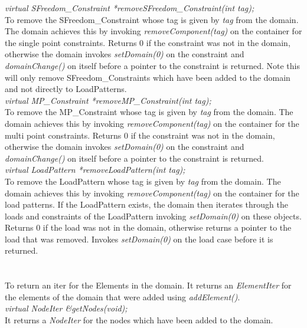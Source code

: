 {\em virtual SFreedom\_Constraint *removeSFreedom\_Constraint(int tag);}\\
To remove the SFreedom\_Constraint whose tag is given by {\em tag} from the
domain. The domain achieves this by invoking {\em
removeComponent(tag)} on the container for the single point
constraints. Returns $0$ if the constraint was not in the domain,
otherwise the domain invokes {\em setDomain(0)} on the constraint and
{\em domainChange()} on itself before a pointer to the constraint is
returned. Note this will only remove SFreedom\_Constraints which have been
added to the domain and not directly to LoadPatterns.\\

{\em virtual MP\_Constraint *removeMP\_Constraint(int tag);} \\
To remove the MP\_Constraint whose tag is given by {\em tag} from the
domain. The domain achieves this by invoking {\em
removeComponent(tag)} on the container for the multi point
constraints. Returns $0$ if the constraint was not in the domain,
otherwise the domain invokes {\em setDomain(0)} on the constraint and
{\em domainChange()} on itself before a pointer to the constraint is
returned.\\   

{\em virtual LoadPattern *removeLoadPattern(int tag);}\\         
To remove the LoadPattern whose tag is given by {\em tag} from the
domain. The domain achieves this by invoking {\em
removeComponent(tag)} on the container for the load patterns. 
If the LoadPattern exists, the domain then iterates through the loads
and constraints of the LoadPattern invoking {\em setDomain(0)} on
these objects. Returns
$0$ if the load was not in the domain, otherwise returns a pointer to
the load that was removed. Invokes {\em setDomain(0)} on the load case
before it is returned.\\ 


  \\
 \\
To return an iter for the Elements in the domain. It returns an {\em
ElementIter} for the elements of the domain that were added using {\em
addElement()}. \\  

{\em virtual NodeIter \&getNodes(void);} \\
It returns a {\em NodeIter} for the nodes which have been added to the
domain. \\ 

